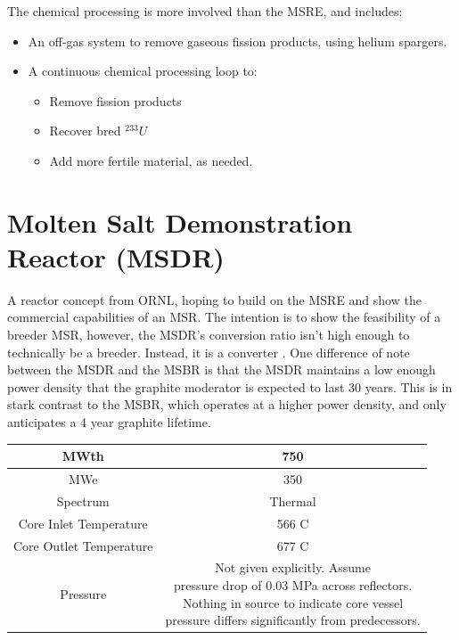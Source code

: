 \documentclass[letterpaper]{article}
\begin{document}
The chemical processing is more involved than the MSRE, and includes:
\begin{itemize}
\item An off-gas system to remove gaseous fission products, using helium spargers.
\item A continuous chemical processing loop to:
	\begin{itemize}
	\item Remove fission products
	\item Recover bred ${}^{233}U$
	\item Add more fertile material, as needed.
	\end{itemize}
\end{itemize}

\section{Molten Salt Demonstration Reactor (MSDR)}
A reactor concept from ORNL, hoping to build on the MSRE and show the commercial capabilities of an MSR.  The intention is to show the feasibility of a breeder MSR, however, the MSDR's conversion ratio isn't high enough to technically be a breeder.  Instead, it is a converter \cite{bettis_design_1972}.  One difference of note between the MSDR and the MSBR is that the  MSDR maintains a low enough power density that the graphite moderator is expected to last 30 years.  This is in stark contrast to the MSBR, which operates at a higher power density, and only anticipates a 4 year graphite lifetime.

\begin{center}
\begin{tabular}{|c|c|}
\hline
MWth & 750 \\
\hline
MWe & 350 \\
\hline
Spectrum & Thermal \\
\hline
Core Inlet Temperature & 566 C\\
\hline
Core Outlet Temperature & 677 C\\
\hline
Pressure & \makecell{Not given explicitly.  Assume\\pressure drop of 0.03 MPa across reflectors.\\Nothing in source to indicate core vessel\\pressure differs significantly from predecessors.} \\
\hline
\end{tabular}
\end{center}
\end{document}
